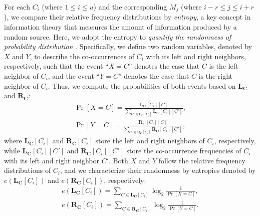 For each $C_i$ (where $1\le i\le u$) and the corresponding $M_j$ (where 
$i-r\le j\le i+r$),  we compare their relative frequency distributions by
{\em entropy}, a key concept in information theory that measures the amount of
information produced by a random source. Here, we adopt the entropy to 
{\em quantify the randomness of probability distribution} \cite{wang08}.
Specifically, we define two random variables, denoted by $X$ and $Y$, to
describe the co-occurrences of $C_i$ with its left and right neighbors,
respectively, such that the event ``$X=C$'' denotes the case that $C$ is the
left neighbor of $C_i$, and the event ``$Y=C$'' denotes the case that $C$ is
the right neighbor of $C_i$.  Thus, we compute the probabilities of both
events based on $\mathbf{L_C}$ and $\mathbf{R_C}$:   
%
\begin{eqnarray}
\Pr[X = C] = \frac{\mathbf{L_C}[C_i][C]}{\sum_{C' \in \mathbf{L_C}[C_i]} \mathbf{L_C}[C_i][C']}, \nonumber \\
\Pr[Y = C] = \frac{\mathbf{R_C}[C_i][C]}{\sum_{C' \in \mathbf{R_C}[C_i]} \mathbf{R_C}[C_i][C']}, \nonumber
\end{eqnarray}
%
where $\mathbf{L_C}[C_i]$ and $\mathbf{R_C}[C_i]$ store the left and right
neighbors of $C_i$, respectively, while $\mathbf{L_C}[C_i][C']$ and
$\mathbf{R_C}[C_i][C']$ store the co-occurrence frequencies of $C_i$ with its
left and right neighbor $C'$.  Both $X$ and $Y$ follow the relative frequency
distributions of $C_i$, and we characterize their randomness by entropies
denoted by $e(\mathbf{L_C}[C_i])$ and $e(\mathbf{R_C}[C_i])$, respectively:  
%
\begin{eqnarray}
    e(\mathbf{L_C}[C_i]) = \sum_{C \in \mathbf{L_C}[C_i]} \log_2\frac{1}{\Pr[X = C]}, \nonumber \\
    e(\mathbf{R_C}[C_i]) = \sum_{C \in \mathbf{R_C}[C_i]} \log_2\frac{1}{\Pr[Y = C]}. \nonumber
\end{eqnarray}

